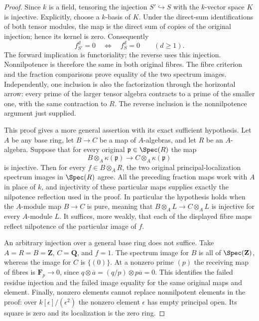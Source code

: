 \begin{proof}
Since $k$ is a field, tensoring the injection
$S'\hookrightarrow S$ with the $k$-vector space $K$
is injective. Explicitly, choose a $k$-basis of $K$.
Under the direct-sum identifications of both tensor
modules, the map is the direct sum of copies of the
original injection; hence its kernel is zero.
Consequently
$$
f_{S'}^d=0\quad\Longleftrightarrow\quad f_S^d=0
\qquad(d\geq1).
$$
The forward implication is functoriality; the reverse
uses this injection. Nonnilpotence is therefore the
same in both original fibres. The fibre criterion
and the fraction comparisons prove equality of the
two spectrum images. Independently, one inclusion
is also the factorization through the horizontal
arrow: every prime of the larger tensor algebra
contracts to a prime of the smaller one, with the
same contraction to $R$. The reverse inclusion is
the nonnilpotence argument just supplied.

\medskip\noindent
This proof gives a more general assertion with its
exact sufficient hypothesis. Let $A$ be any base
ring, let $B\to C$ be a map of $A$-algebras, and
let $R$ be an $A$-algebra. Suppose that for every
original $\mathfrak p\in\Spec(R)$ the map
$$
B\otimes_A\kappa(\mathfrak p)
\longrightarrow C\otimes_A\kappa(\mathfrak p)
$$
is injective. Then for every $f\in B\otimes_AR$,
the two original principal-localization spectrum
images in $\Spec(R)$ agree. All the preceding
fraction maps work with $A$ in place of $k$,
and injectivity of these particular maps supplies
exactly the nilpotence reflection used in the proof.
In particular the hypothesis holds when the
$A$-module map $B\to C$ is pure, meaning that
$B\otimes_AL\to C\otimes_AL$ is injective for
every $A$-module $L$. It suffices, more weakly,
that each of the displayed fibre maps reflect
nilpotence of the particular image of $f$.

An arbitrary injection over a general base ring
does not suffice. Take $A=R=B=\mathbf Z$,
$C=\mathbf Q$, and $f=1$. The spectrum image
for $B$ is all of $\Spec(\mathbf Z)$, whereas
the image for $C$ is $\{(0)\}$. At a nonzero
prime $(p)$ the receiving map of fibres is
$\mathbf F_p\to0$, since
$q\otimes\overline a=(q/p)\otimes p\overline a=0$.
This identifies the failed residue injection and
the failed image equality for the same original
maps and element. Finally, nonzero elements cannot
replace nonnilpotent elements in the proof: over
$k[\epsilon]/(\epsilon^2)$ the nonzero element
$\epsilon$ has empty principal open. Its square
is zero and its localization is the zero ring.
\end{proof}